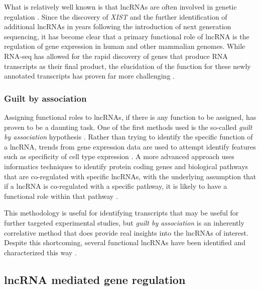 What is relatively well known is that lncRNAs are often involved in genetic regulation \cite{Kirk2018FunctionalContent,Schertzer2019LncRNA-InducedDNA,Hacisuleyman2016FunctionLocus,Rinn2012GenomeRNAs}. Since the discovery of \emph{XIST} and the further identification of additional lncRNAs in years following the introduction of next generation sequencing, it has become clear that a primary functional role of lncRNA is the regulation of gene expression in human and other mammalian genomes. While RNA-seq has allowed for the rapid discovery of genes that produce RNA transcripts as their final product, the elucidation of the function for these newly annotated transcripts has proven far more challenging \cite{Kirk2018FunctionalContent,Rinn2012GenomeRNAs}. 

\subsubsection{Guilt by association}
Assigning functional roles to lncRNAs, if there is any function to be assigned, has proven to be a daunting task. One of the first methods used is the so-called \emph{guilt by association} hypothesis \cite{Guttman2009ChromatinMammals,Rinn2012GenomeRNAs}. Rather than trying to identify the specific function of a lncRNA, trends from gene expression data are used to attempt identify features such as specificity of cell type expression \cite{Mercer2008SpecificBrain,Perron2017InExpression,Lefever2017DecodeRNA-Guilt-by-association}. A more advanced approach uses informatics techniques to identify protein coding genes and biological pathways that are co-regulated with specific lncRNAs, with the underlying assumption that if a lncRNA is co-regulated with a specific pathway, it is likely to have a functional role within that pathway \cite{Thiel2019IdentifyingAnalysis}. 

This methodology is useful for identifying transcripts that may be useful for further targeted experimental studies, but \emph{guilt by association} is an inherently correlative method that does provide real insights into the lncRNAs of interest. Despite this shortcoming, several functional lncRNAs have been identified and characterized this way \cite{Gupta2010LongMetastasis, Broadbent2011ALncRNAs}. 


\subsection{lncRNA mediated gene regulation}

